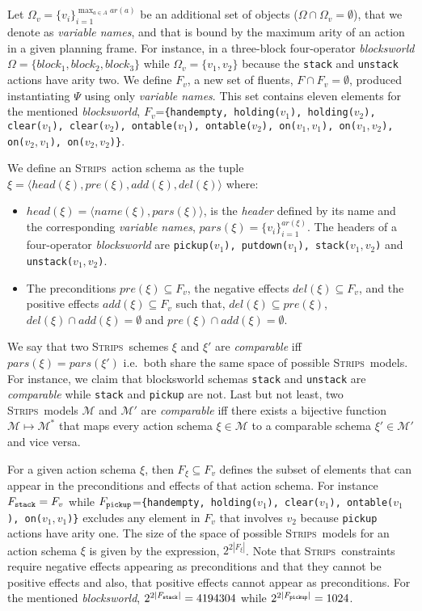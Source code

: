 \documentclass[letterpaper]{article} %
\newcommand{\tup}[1]{{\langle #1 \rangle}}
\newcommand{\strips}{\textsc{Strips}}     %
\begin{document}
Let $\Omega_v=\{v_i\}_{i=1}^{\operatorname*{max}_{a\in A} ar(a)}$ be an additional set of objects ($\Omega\cap\Omega_v=\emptyset$), that we denote as {\em variable names}, and that is bound by the maximum arity of an action in a given planning frame. For instance, in a three-block four-operator {\em blocksworld} $\Omega=\{block_1, block_2, block_3\}$ while $\Omega_v=\{v_1, v_2\}$ because the {\small\tt stack} and {\small\tt unstack} actions have arity two. We define $F_v$, a new set of fluents, $F\cap F_v=\emptyset$, produced instantiating $\Psi$ using only {\em variable names}. This set contains eleven elements for the mentioned {\em blocksworld}, $F_v$={\small\tt\{handempty, holding($v_1$), holding($v_2$), clear($v_1$), clear($v_2$), ontable($v_1$), ontable($v_2$), on($v_1,v_1$), on($v_1,v_2$), on($v_2,v_1$), on($v_2,v_2$)\}}.

We define an \strips\ action schema as the tuple $\xi=\tup{head(\xi),pre(\xi),add(\xi),del(\xi)}$ where:
\begin{itemize}
\item $head(\xi)=\tup{name(\xi),pars(\xi)}$, is the {\em header} defined by its name and the corresponding {\em variable names}, $pars(\xi)=\{v_i\}_{i=1}^{ar(\xi)}$. The headers of a four-operator {\em blocksworld} are {\small\tt pickup($v_1$), putdown($v_1$), stack($v_1,v_2$)} and {\small\tt unstack($v_1,v_2$)}.
\item The preconditions $pre(\xi)\subseteq F_v$, the negative effects $del(\xi)\subseteq F_v$, and the positive effects $add(\xi)\subseteq F_v$ such that, $del(\xi)\subseteq pre(\xi)$, $del(\xi)\cap add(\xi)=\emptyset$ and $pre(\xi)\cap add(\xi)=\emptyset$.
\end{itemize}

We say that two \strips\ schemes $\xi$ and $\xi'$ are {\em comparable} iff $pars(\xi)=pars(\xi')$ i.e.~both share the same space of possible \strips\ models. For instance, we claim that blocksworld schemas {\small\tt stack} and {\small\tt unstack} are {\em comparable} while  {\small\tt stack} and {\small\tt pickup} are not. Last but not least, two \strips\ models $\mathcal{M}$ and $\mathcal{M}'$ are {\em comparable} iff there exists a bijective function $\mathcal{M} \mapsto \mathcal{M}^*$ that maps every action schema $\xi\in\mathcal{M}$ to a comparable schema $\xi'\in\mathcal{M'}$ and vice versa.

For a given action schema $\xi$, then $F_{\xi}\subseteq F_v$ defines the subset of elements that can appear in the preconditions and effects of that action schema. For instance $F_{\tt stack}=F_v$ while $F_{\tt pickup}$={\small\tt\{handempty, holding($v_1$), clear($v_1$), ontable($v_1$), on($v_1,v_1$)\}} excludes any element in $F_v$ that involves $v_2$ because {\small\tt pickup} actions have arity one. The size of the space of possible \strips\ models for an action schema $\xi$ is given by the expression, $2^{2|F_{\xi}|}$. Note that \strips\ constraints require negative effects appearing as preconditions and that they cannot be positive effects and also, that positive effects cannot appear as preconditions. For the mentioned {\em blocksworld}, $2^{2|F_{\tt stack}|}=4194304$ while $2^{2|F_{\tt pickup}|}=1024$.
\end{document}
